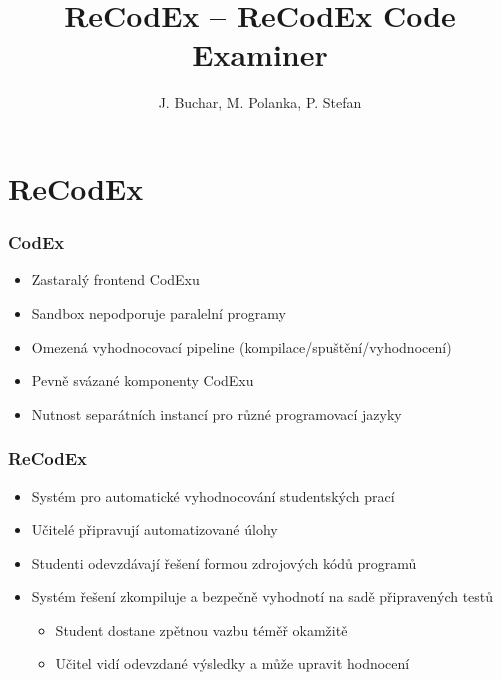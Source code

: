 \documentclass{beamer}
\begin{document}

\title[ReCodEx -- ReCodEx Code Examiner] %
{ReCodEx -- ReCodEx Code Examiner}
\author[Buchar, Polanka, Stefan]{J. Buchar, M. Polanka, P. Stefan}
\date[3. 12. 2016]{} %
\subject{Computer Science}

\frame{\titlepage}

\section{ReCodEx}

\begin{frame}
	\frametitle{CodEx}
	\begin{itemize}
		\item Zastaralý frontend CodExu
		\item Sandbox nepodporuje paralelní programy
		\item Omezená vyhodnocovací pipeline (kompilace/spuštění/vyhodnocení)
		\item Pevně svázané komponenty CodExu
		\item Nutnost separátních instancí pro různé programovací jazyky
	\end{itemize}
\end{frame}

\begin{frame}
	\frametitle{ReCodEx}
	\begin{itemize}
		\item Systém pro automatické vyhodnocování studentských prací
		\item Učitelé připravují automatizované úlohy
		\item Studenti odevzdávají řešení formou zdrojových kódů programů
		\item Systém řešení zkompiluje a bezpečně vyhodnotí na sadě připravených testů
		\begin{itemize}
			\item Student dostane zpětnou vazbu téměř okamžitě
			\item Učitel vidí odevzdané výsledky a může upravit hodnocení
		\end{itemize}
	\end{itemize}
\end{frame}
\end{document}
